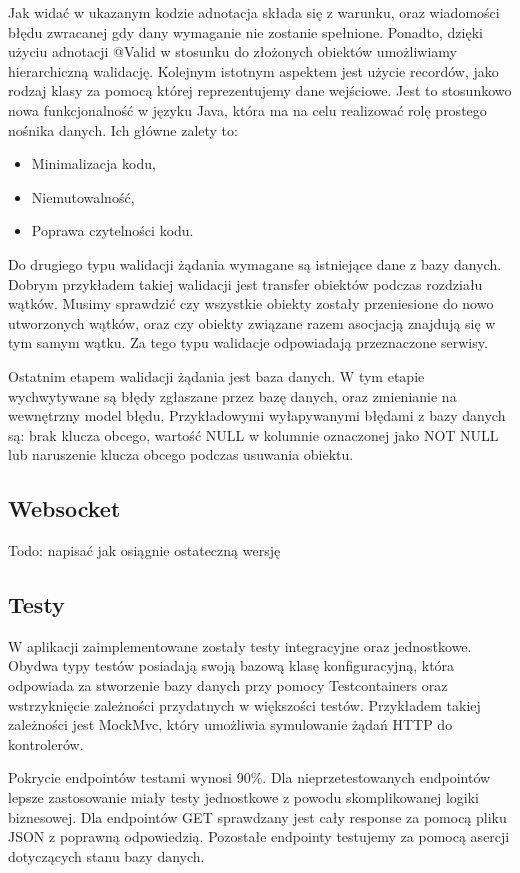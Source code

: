 Jak widać w ukazanym kodzie adnotacja składa się z warunku, oraz wiadomości błędu zwracanej gdy dany wymaganie nie zostanie 
spełnione. Ponadto, dzięki użyciu adnotacji @Valid w stosunku do złożonych obiektów umożliwiamy hierarchiczną walidację.
Kolejnym istotnym aspektem jest użycie recordów, jako rodzaj klasy za pomocą której reprezentujemy dane wejściowe. Jest to stosunkowo
nowa funkcjonalność w języku Java, która ma na celu realizować rolę prostego nośnika danych. Ich główne zalety to:
\begin{itemize}
    \item Minimalizacja kodu,
    \item Niemutowalność,
    \item Poprawa czytelności kodu.
\end{itemize}

Do drugiego typu walidacji żądania wymagane są istniejące dane z bazy danych. Dobrym przykładem takiej walidacji jest transfer 
obiektów podczas rozdziału wątków. Musimy sprawdzić czy wszystkie obiekty zostały przeniesione do nowo utworzonych wątków, oraz 
czy obiekty związane razem asocjacją znajdują się w tym samym wątku. Za tego typu walidacje odpowiadają przeznaczone serwisy.

Ostatnim etapem walidacji żądania jest baza danych. W tym etapie wychwytywane są błędy zgłaszane przez bazę danych, oraz zmienianie
na wewnętrzny model błędu. Przykładowymi wyłapywanymi błędami z bazy danych są: brak klucza obcego, wartość NULL w kolumnie oznaczonej
jako NOT NULL lub naruszenie klucza obcego podczas usuwania obiektu. 

\subsection{Websocket}

Todo: napisać jak osiągnie ostateczną wersję

\subsection{Testy}

W aplikacji zaimplementowane zostały testy integracyjne oraz jednostkowe. Obydwa typy testów posiadają swoją bazową klasę
konfiguracyjną, która odpowiada za stworzenie bazy danych przy pomocy Testcontainers oraz wstrzyknięcie zależności przydatnych
w większości testów. Przykładem takiej zależności jest MockMvc, który umożliwia symulowanie żądań HTTP do kontrolerów.

Pokrycie endpointów testami wynosi 90\%. Dla nieprzetestowanych endpointów lepsze zastosowanie miały testy jednostkowe z powodu
skomplikowanej logiki biznesowej. Dla endpointów GET sprawdzany jest cały response za pomocą pliku JSON z poprawną odpowiedzią.
Pozostałe endpointy testujemy za pomocą asercji dotyczących stanu bazy danych.

